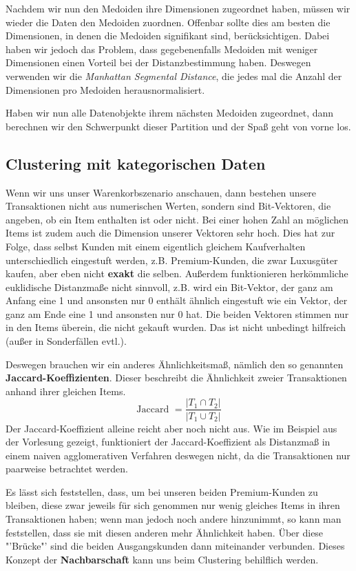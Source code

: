 Nachdem wir nun den Medoiden ihre Dimensionen zugeordnet haben, müssen
wir wieder die Daten den Medoiden zuordnen. Offenbar sollte dies am besten
die Dimensionen, in denen die Medoiden signifikant sind, berücksichtigen.
Dabei haben wir jedoch das Problem, dass gegebenenfalls Medoiden mit weniger
Dimensionen einen Vorteil bei der Distanzbestimmung haben. Deswegen 
verwenden wir die \textit{Manhattan Segmental Distance}, die jedes mal
die Anzahl der Dimensionen pro Medoiden herausnormalisiert.

Haben wir nun alle Datenobjekte ihrem nächsten Medoiden zugeordnet, dann
berechnen wir den Schwerpunkt dieser Partition und der Spaß geht von vorne los.


\subsection{Clustering mit kategorischen Daten}
Wenn wir uns unser Warenkorbszenario anschauen, dann bestehen unsere
Transaktionen nicht aus numerischen Werten, sondern sind Bit-Vektoren, die
angeben, ob ein Item enthalten ist oder nicht. Bei einer hohen Zahl an
möglichen Items ist zudem auch die Dimension unserer Vektoren sehr hoch.
Dies hat zur Folge, dass selbst Kunden mit einem eigentlich gleichem Kaufverhalten
unterschiedlich eingestuft werden, z.B. Premium-Kunden, die zwar Luxusgüter
kaufen, aber eben nicht \textbf{exakt} die selben. Außerdem funktionieren
herkömmliche euklidische Distanzmaße nicht sinnvoll, z.B. wird ein Bit-Vektor,
der ganz am Anfang eine 1 und ansonsten nur 0 enthält ähnlich eingestuft
wie ein Vektor, der ganz am Ende eine 1 und ansonsten nur 0 hat. Die beiden
Vektoren stimmen nur in den Items überein, die nicht gekauft wurden. Das
ist nicht unbedingt hilfreich (außer in Sonderfällen evtl.).

Deswegen brauchen wir ein anderes Ähnlichkeitsmaß, nämlich den
so genannten \textbf{Jaccard-Koeffizienten}. Dieser beschreibt die
Ähnlichkeit zweier Transaktionen anhand ihrer gleichen Items.
\[\text{Jaccard } = \frac{\left| T_1 \cap T_2 \right|}{\left| T_1 \cup T_2 \right|}\]
Der Jaccard-Koeffizient alleine reicht aber noch nicht aus. Wie im Beispiel
aus der Vorlesung gezeigt, funktioniert der Jaccard-Koeffizient als Distanzmaß
in einem naiven agglomerativen Verfahren deswegen nicht, da die Transaktionen
nur paarweise betrachtet werden. 

Es lässt sich feststellen, dass, um bei unseren beiden Premium-Kunden zu bleiben,
diese zwar jeweils für sich genommen nur wenig gleiches Items in ihren
Transaktionen haben; wenn man jedoch noch andere hinzunimmt, so
kann man feststellen, dass sie mit diesen anderen mehr Ähnlichkeit haben.
Über diese "'Brücke"' sind die beiden Ausgangskunden dann miteinander
verbunden. Dieses Konzept der \textbf{Nachbarschaft} kann uns beim
Clustering behilflich werden. 


